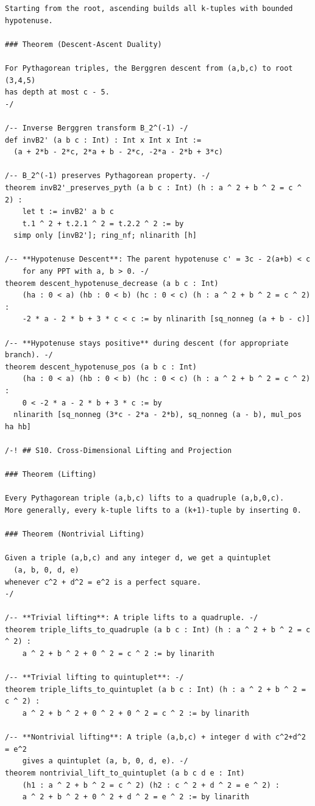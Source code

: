 \documentclass[11pt,openright,twoside]{book}
\theoremstyle{definition}
\begin{document}
\begin{lstlisting}[style=lean]
Starting from the root, ascending builds all k-tuples with bounded hypotenuse.

### Theorem (Descent-Ascent Duality)

For Pythagorean triples, the Berggren descent from (a,b,c) to root (3,4,5)
has depth at most c - 5.
-/

/-- Inverse Berggren transform B_2^(-1) -/
def invB2' (a b c : Int) : Int x Int x Int :=
  (a + 2*b - 2*c, 2*a + b - 2*c, -2*a - 2*b + 3*c)

/-- B_2^(-1) preserves Pythagorean property. -/
theorem invB2'_preserves_pyth (a b c : Int) (h : a ^ 2 + b ^ 2 = c ^ 2) :
    let t := invB2' a b c
    t.1 ^ 2 + t.2.1 ^ 2 = t.2.2 ^ 2 := by
  simp only [invB2']; ring_nf; nlinarith [h]

/-- **Hypotenuse Descent**: The parent hypotenuse c' = 3c - 2(a+b) < c
    for any PPT with a, b > 0. -/
theorem descent_hypotenuse_decrease (a b c : Int)
    (ha : 0 < a) (hb : 0 < b) (hc : 0 < c) (h : a ^ 2 + b ^ 2 = c ^ 2) :
    -2 * a - 2 * b + 3 * c < c := by nlinarith [sq_nonneg (a + b - c)]

/-- **Hypotenuse stays positive** during descent (for appropriate branch). -/
theorem descent_hypotenuse_pos (a b c : Int)
    (ha : 0 < a) (hb : 0 < b) (hc : 0 < c) (h : a ^ 2 + b ^ 2 = c ^ 2) :
    0 < -2 * a - 2 * b + 3 * c := by
  nlinarith [sq_nonneg (3*c - 2*a - 2*b), sq_nonneg (a - b), mul_pos ha hb]

/-! ## S10. Cross-Dimensional Lifting and Projection

### Theorem (Lifting)

Every Pythagorean triple (a,b,c) lifts to a quadruple (a,b,0,c).
More generally, every k-tuple lifts to a (k+1)-tuple by inserting 0.

### Theorem (Nontrivial Lifting)

Given a triple (a,b,c) and any integer d, we get a quintuplet
  (a, b, 0, d, e)
whenever c^2 + d^2 = e^2 is a perfect square.
-/

/-- **Trivial lifting**: A triple lifts to a quadruple. -/
theorem triple_lifts_to_quadruple (a b c : Int) (h : a ^ 2 + b ^ 2 = c ^ 2) :
    a ^ 2 + b ^ 2 + 0 ^ 2 = c ^ 2 := by linarith

/-- **Trivial lifting to quintuplet**: -/
theorem triple_lifts_to_quintuplet (a b c : Int) (h : a ^ 2 + b ^ 2 = c ^ 2) :
    a ^ 2 + b ^ 2 + 0 ^ 2 + 0 ^ 2 = c ^ 2 := by linarith

/-- **Nontrivial lifting**: A triple (a,b,c) + integer d with c^2+d^2 = e^2
    gives a quintuplet (a, b, 0, d, e). -/
theorem nontrivial_lift_to_quintuplet (a b c d e : Int)
    (h1 : a ^ 2 + b ^ 2 = c ^ 2) (h2 : c ^ 2 + d ^ 2 = e ^ 2) :
    a ^ 2 + b ^ 2 + 0 ^ 2 + d ^ 2 = e ^ 2 := by linarith


\end{lstlisting}
\end{document}

